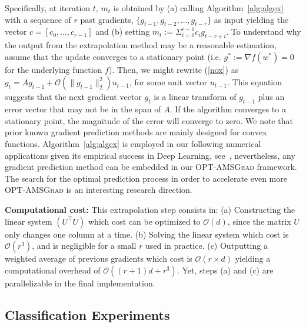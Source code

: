 \documentclass[twoside]{article}
\begin{document}
Specifically, at iteration $t$, $m_t$ is obtained by \textsf{(a)} calling Algorithm~\ref{alg:algex} with a sequence of $r$ past gradients, $\{ g_{t-1},g_{t-2}, \dots, g_{t-r} \}$ as input yielding the vector $c = [c_0, \dots, c_{r-1}] $ and \textsf{(b)} setting $m_t:= \Sigma_{i=0}^{r-1} c_i g_{t-r+i}$.
To understand why the output from the extrapolation method may be a reasonable estimation, assume that the update converges to a stationary point (i.e. $g^*:=\nabla f(w^*) = 0$ for the underlying function $f$). Then, we might rewrite (\ref{nox}) as $g_t = A g_{t-1}  + \mathcal{O}( \| g_{t-1} \|_2^2 ) u_{t-1}$, for some unit vector $u_{t-1}$.
This equation suggests that the next gradient vector $g_{t}$ is a linear transform of $g_{{t-1}}$ plus an error vector that may not be in the span of $A$.
If the algorithm converges to a stationary point, the magnitude of the error will converge to zero. 
We note that prior known gradient prediction methods are mainly designed for convex functions.
Algorithm~\ref{alg:algex} is employed in our following numerical applications given its empirical success in Deep Learning, see~\cite{Scieur18}, nevertheless, any gradient prediction method can be embedded in our \textsc{OPT-AMSGrad} framework.
The search for the optimal prediction process in order to accelerate even more \textsc{OPT-AMSGrad} is an interesting research direction.

\textbf{Computational cost:}
 This extrapolation step consists in: \textsf{(a)} Constructing the linear system $(U^\top U)$ which cost can be optimized to $\mathcal{O}(d)$, since the matrix $U$ only changes one column at a time. \textsf{(b)} Solving the linear system which cost is $\mathcal{O}(r^3)$, and is negligible for a small $r$ used in practice.\textsf{ (c)} Outputting a weighted average of previous gradients which cost is $\mathcal{O}(r \times d)$ yielding a computational overhead of $\mathcal O\left((r+1)d+r^3\right)$.
Yet, steps \textsf{(a)} and \textsf{(c)} are parallelizable in the final implementation.


\subsection{Classification Experiments}
\vspace{-0.05in}
\end{document}
